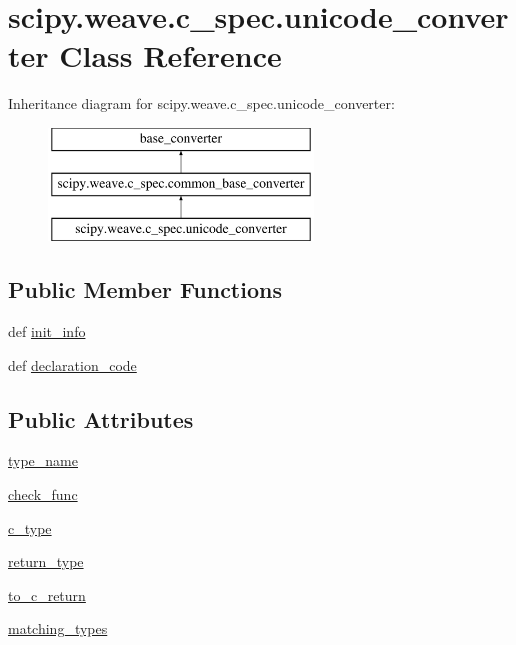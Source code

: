 \hypertarget{classscipy_1_1weave_1_1c__spec_1_1unicode__converter}{}\section{scipy.\+weave.\+c\+\_\+spec.\+unicode\+\_\+converter Class Reference}
\label{classscipy_1_1weave_1_1c__spec_1_1unicode__converter}
Inheritance diagram for scipy.\+weave.\+c\+\_\+spec.\+unicode\+\_\+converter\+:\begin{figure}[H]
\begin{center}
\leavevmode
\includegraphics[height=3.000000cm]{classscipy_1_1weave_1_1c__spec_1_1unicode__converter}
\end{center}
\end{figure}
\subsection*{Public Member Functions}
\begin{DoxyCompactItemize}
\item 
def \hyperlink{classscipy_1_1weave_1_1c__spec_1_1unicode__converter_afd7e691e5918dcbe170c16b72c8bce7c}{init\+\_\+info}
\item 
def \hyperlink{classscipy_1_1weave_1_1c__spec_1_1unicode__converter_a8eb9e46e71b1bf74d28510a683755928}{declaration\+\_\+code}
\end{DoxyCompactItemize}
\subsection*{Public Attributes}
\begin{DoxyCompactItemize}
\item 
\hyperlink{classscipy_1_1weave_1_1c__spec_1_1unicode__converter_ad032b19394f00de185d667f687456cca}{type\+\_\+name}
\item 
\hyperlink{classscipy_1_1weave_1_1c__spec_1_1unicode__converter_a6f7bad9679de9fb83d416e613f5ba458}{check\+\_\+func}
\item 
\hyperlink{classscipy_1_1weave_1_1c__spec_1_1unicode__converter_a4884b7d83865e49208386a08d031b889}{c\+\_\+type}
\item 
\hyperlink{classscipy_1_1weave_1_1c__spec_1_1unicode__converter_a826cd3a18515095dd8841c0f4ee11865}{return\+\_\+type}
\item 
\hyperlink{classscipy_1_1weave_1_1c__spec_1_1unicode__converter_a32921c224e3152909f197f6de402eae0}{to\+\_\+c\+\_\+return}
\item 
\hyperlink{classscipy_1_1weave_1_1c__spec_1_1unicode__converter_ac464275948a20f16f97740c61ca3a9c6}{matching\+\_\+types}
\end{DoxyCompactItemize}


